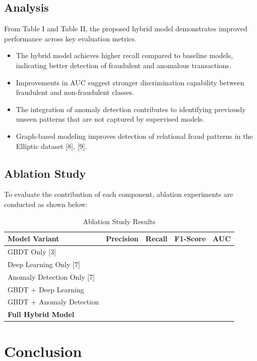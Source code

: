 \documentclass[conference]{IEEEtran}
\begin{document}
\subsection{Analysis}

From Table I and Table II, the proposed hybrid model demonstrates improved performance across key evaluation metrics.

\begin{itemize}
    \item The hybrid model achieves higher recall compared to baseline models, indicating better detection of fraudulent and anomalous transactions.
    \item Improvements in AUC suggest stronger discrimination capability between fraudulent and non-fraudulent classes.
    \item The integration of anomaly detection contributes to identifying previously unseen patterns that are not captured by supervised models.
    \item Graph-based modeling improves detection of relational fraud patterns in the Elliptic dataset [8], [9].
\end{itemize}

\subsection{Ablation Study}

To evaluate the contribution of each component, ablation experiments are conducted as shown below:

\begin{table}[h]
\centering
\caption{Ablation Study Results}
\begin{tabular}{lcccc}
\hline
Model Variant & Precision & Recall & F1-Score & AUC \\
\hline
GBDT Only [3] &  &  &  &  \\
Deep Learning Only [7] &  &  &  &  \\
Anomaly Detection Only [7] &  &  &  &  \\
GBDT + Deep Learning &  &  &  &  \\
GBDT + Anomaly Detection &  &  &  &  \\
\textbf{Full Hybrid Model} &  &  &  &  \\
\hline
\end{tabular}
\end{table}


\section{Conclusion}
\end{document}

